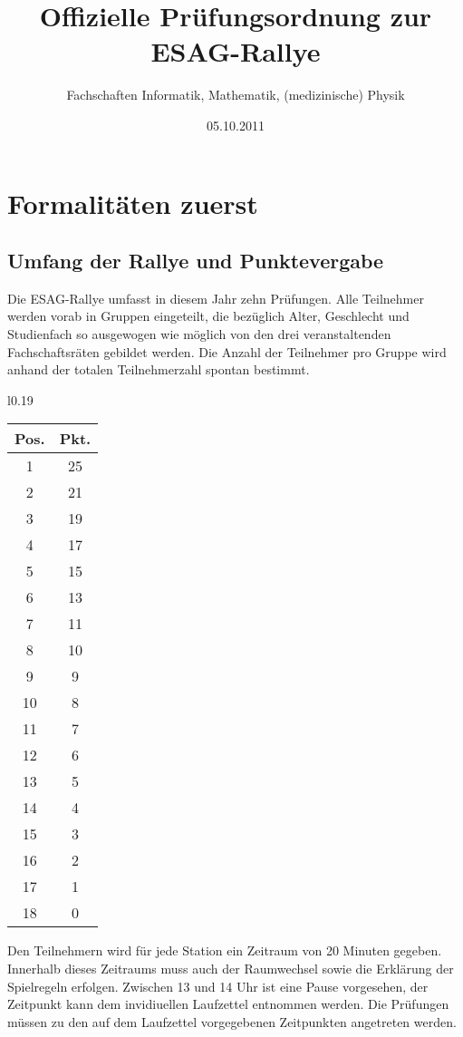 \documentclass[a4paper,10pt]{article}
\title{Offizielle Prüfungsordnung zur ESAG-Rallye}
\author{Fachschaften Informatik, Mathematik, (medizinische) Physik}
\date{05.10.2011}
\begin{document}
\pagestyle{plain}
\maketitle
\tableofcontents

\newpage
\pagestyle{plain}
\section[Formalitäten]{Formalitäten zuerst}

\subsection{Umfang der Rallye und Punktevergabe}

Die ESAG-Rallye umfasst in diesem Jahr zehn Prüfungen. Alle Teilnehmer
werden vorab in Gruppen eingeteilt, die bezüglich Alter, Geschlecht und
Studienfach so ausgewogen wie möglich von den drei veranstaltenden
Fachschaftsräten gebildet werden. Die Anzahl der Teilnehmer pro Gruppe
 wird anhand der totalen Teilnehmerzahl spontan bestimmt.

\begin{wrapfigure}{l}{0.19\textwidth}
\begin{tabular}{c|c}
\textbf{Pos.} & \textbf{Pkt.} \\
\hline
1 & 25\\
2 & 21 \\
3 & 19 \\
4 & 17 \\
5 & 15 \\
6 & 13 \\
7 & 11 \\
8 & 10 \\
9 & 9 \\
10 &8 \\
11 & 7 \\
12 & 6 \\
13 & 5 \\
14 & 4 \\
15 & 3\\
16 & 2\\
17 & 1\\
18 & 0 
\end{tabular}
\vspace{15pt}
\end{wrapfigure}

Den Teilnehmern wird für jede Station ein Zeitraum von 20 Minuten gegeben. Innerhalb dieses Zeitraums muss auch der Raumwechsel sowie die Erklärung der Spielregeln erfolgen. Zwischen 13 und 14 Uhr ist eine Pause vorgesehen, der Zeitpunkt kann dem invidiuellen Laufzettel entnommen werden. Die Prüfungen müssen zu den auf dem Laufzettel vorgegebenen Zeitpunkten angetreten werden.
\end{document}
